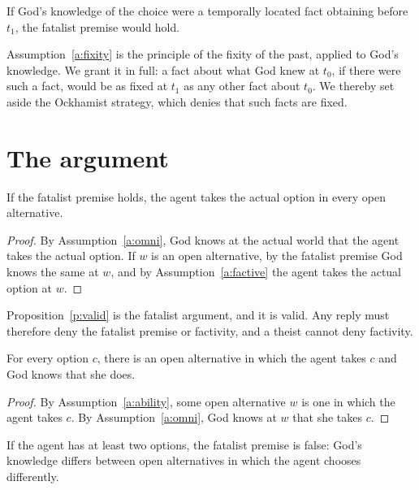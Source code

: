 \documentclass{situationist-preprint}
\begin{document}
\begin{assumption}\label{a:fixity}
If God's knowledge of the choice were a temporally located fact obtaining before $t_1$, the fatalist premise would hold.
\end{assumption}

Assumption~\ref{a:fixity} is the principle of the fixity of the past, applied to God's knowledge. We grant it in full: a fact about what God knew at $t_0$, if there were such a fact, would be as fixed at $t_1$ as any other fact about $t_0$. We thereby set aside the Ockhamist strategy, which denies that such facts are fixed.

\section{The argument}

\begin{proposition}\label{p:valid}
If the fatalist premise holds, the agent takes the actual option in every open alternative.
\end{proposition}

\begin{proof}
By Assumption~\ref{a:omni}, God knows at the actual world that the agent takes the actual option. If $w$ is an open alternative, by the fatalist premise God knows the same at $w$, and by Assumption~\ref{a:factive} the agent takes the actual option at $w$.
\end{proof}

Proposition~\ref{p:valid} is the fatalist argument, and it is valid. Any reply must therefore deny the fatalist premise or factivity, and a theist cannot deny factivity.

\begin{theorem}\label{t:main}
For every option $c$, there is an open alternative in which the agent takes $c$ and God knows that she does.
\end{theorem}

\begin{proof}
By Assumption~\ref{a:ability}, some open alternative $w$ is one in which the agent takes $c$. By Assumption~\ref{a:omni}, God knows at $w$ that she takes $c$.
\end{proof}

\begin{corollary}\label{c:false}
If the agent has at least two options, the fatalist premise is false: God's knowledge differs between open alternatives in which the agent chooses differently.
\end{corollary}
\end{document}
